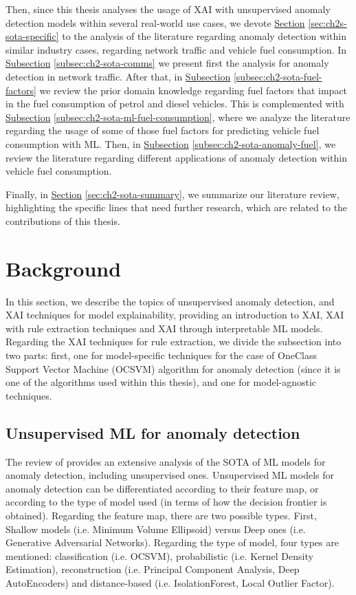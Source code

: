 Then, since this thesis analyses the usage of XAI with unsupervised anomaly detection models within several real-world use cases, we devote \hyperref[sec:ch2s-sota-specific]{Section} \ref{sec:ch2s-sota-specific} to the analysis of the literature regarding anomaly detection within similar industry cases, regarding network traffic and vehicle fuel consumption. In  \hyperref[subsec:ch2-sota-comms]{Subsection} \ref{subsec:ch2-sota-comms} we present first the analysis for anomaly detection in network traffic. After that, in \hyperref[subsec:ch2-sota-fuel-factors]{Subsection} \ref{subsec:ch2-sota-fuel-factors} we review the prior domain knowledge regarding fuel factors that impact in the fuel consumption of petrol and diesel vehicles. This is complemented with \hyperref[subsec:ch2-sota-ml-fuel-consumption]{Subsection} \ref{subsec:ch2-sota-ml-fuel-consumption}, where we analyze the literature regarding the usage of some of those fuel factors for predicting vehicle fuel consumption with ML. Then, in \hyperref[subsec:ch2-sota-anomaly-fuel]{Subsection} \ref{subsec:ch2-sota-anomaly-fuel}, we review the literature regarding different applications of anomaly detection within vehicle fuel consumption.

Finally, in \hyperref[sec:ch2-sota-summary]{Section} \ref{sec:ch2-sota-summary}, we summarize our literature review, highlighting the specific lines that need further research, which are related to the contributions of this thesis.

\section{Background}\label{sec:ch2-sota-generic}
In this section, we describe the topics of unsupervised anomaly detection, and XAI techniques for model explainability, providing an introduction to XAI, XAI with rule extraction techniques and XAI through interpretable ML models. Regarding the XAI techniques for rule extraction, we divide the subsection into two parts: first, one for model-specific techniques for the case of OneClass Support Vector Machine (OCSVM) algorithm for anomaly detection (since it is one of the algorithms used within this thesis), and one for model-agnostic techniques.

\subsection{Unsupervised ML for anomaly detection}\label{subsec:ch2-sota-unsupervised-anomaly-ml}
The review of \parencite{ruff2021unifying} provides an extensive analysis of the SOTA of ML models for anomaly detection, including unsupervised ones. Unsupervised ML models for anomaly detection can be differentiated according to their feature map, or according to the type of model used (in terms of how the decision frontier is obtained). Regarding the feature map, there are two possible types. First, Shallow models (i.e. Minimum Volume Ellipsoid) versus Deep ones (i.e. Generative Adversarial Networks). Regarding the type of model, four types are mentioned: classification (i.e. OCSVM), probabilistic (i.e. Kernel Density Estimation), reconstruction (i.e. Principal Component Analysis, Deep AutoEncoders) and distance-based (i.e. IsolationForest, Local Outlier Factor). 

